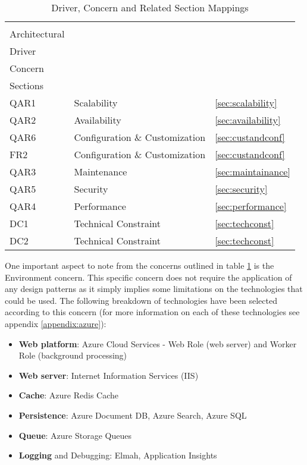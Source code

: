 \begin{table}[h]
\centering
\begin{tabularx}{\linewidth}{lXl}
\rowcolor[HTML]{EFEFEF} 
\begin{tabular}[c]{@{}l@{}}Candidat\\ Architectural\\ Driver\end{tabular} & \begin{tabular}[c]{@{}l@{}}Design\\ Concern\end{tabular} & \begin{tabular}[c]{@{}l@{}}Related\\ Sections\end{tabular} \\
QAR1 & Scalability & \ref{sec:scalability} \\
QAR2 & Availability & \ref{sec:availability} \\
QAR6 & Configuration \& Customization & \ref{sec:custandconf} \\
FR2 & Configuration \& Customization & \ref{sec:custandconf} \\
QAR3 & Maintenance & \ref{sec:maintainance} \\
QAR5 & Security & \ref{sec:security} \\
QAR4 & Performance & \ref{sec:performance} \\
DC1 & Technical Constraint & \ref{sec:techconst} \\
DC2 & Technical Constraint & \ref{sec:techconst} \\
\end{tabularx}
\caption{Driver, Concern and Related Section Mappings}
\label{table:designconcerns}
\end{table}

One important aspect to note from the concerns outlined in table \ref{table:designconcerns} is the Environment concern. This specific concern does not require the application of any design patterns as it simply implies some limitations on the technologies that could be used. The following breakdown of technologies have been selected according to this concern (for more information on each of these technologies see appendix \ref{appendix:azure}):
\begin{itemize}
\item \textbf{Web platform}: Azure Cloud Services - Web Role (web server) and Worker Role (background processing)
\item \textbf{Web server}: Internet Information Services (IIS)
\item \textbf{Cache}: Azure Redis Cache
\item \textbf{Persistence}: Azure Document DB, Azure Search, Azure SQL
\item \textbf{Queue}: Azure Storage Queues
\item \textbf{Logging} and Debugging: Elmah, Application Insights
\end{itemize}

